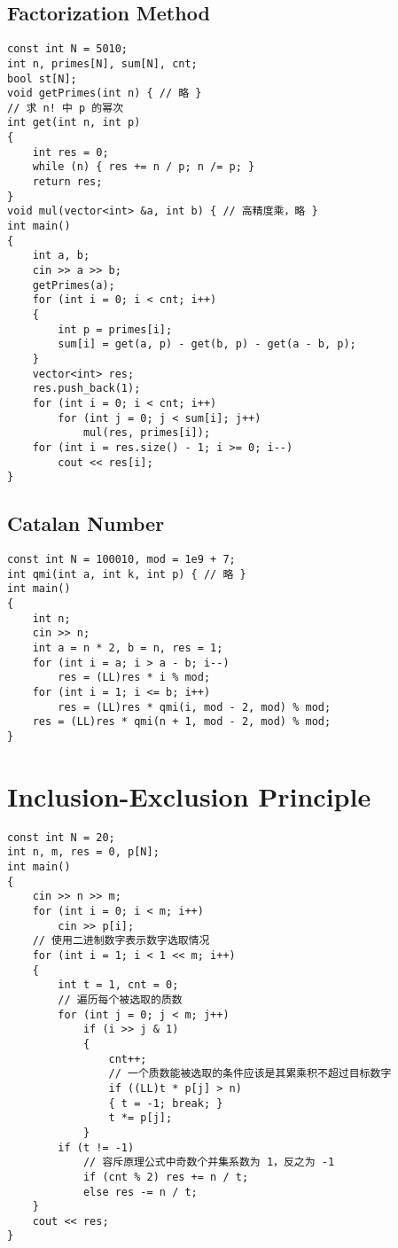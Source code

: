 \subsection{Factorization Method}
\begin{lstlisting}
const int N = 5010;
int n, primes[N], sum[N], cnt;
bool st[N];
void getPrimes(int n) { // 略 }
// 求 n! 中 p 的幂次
int get(int n, int p)
{
    int res = 0;
    while (n) { res += n / p; n /= p; }
    return res;
}
void mul(vector<int> &a, int b) { // 高精度乘，略 }
int main()
{
    int a, b;
    cin >> a >> b;
    getPrimes(a);
    for (int i = 0; i < cnt; i++)
    {
        int p = primes[i];
        sum[i] = get(a, p) - get(b, p) - get(a - b, p);
    }
    vector<int> res;
    res.push_back(1);
    for (int i = 0; i < cnt; i++)
        for (int j = 0; j < sum[i]; j++)
            mul(res, primes[i]);
    for (int i = res.size() - 1; i >= 0; i--)
        cout << res[i];
}
\end{lstlisting}
\subsection{Catalan Number}
\begin{lstlisting}
const int N = 100010, mod = 1e9 + 7;
int qmi(int a, int k, int p) { // 略 }
int main()
{
    int n;
    cin >> n;
    int a = n * 2, b = n, res = 1;
    for (int i = a; i > a - b; i--)
        res = (LL)res * i % mod;
    for (int i = 1; i <= b; i++)
        res = (LL)res * qmi(i, mod - 2, mod) % mod;
    res = (LL)res * qmi(n + 1, mod - 2, mod) % mod;
}
\end{lstlisting}
\section{Inclusion-Exclusion Principle}
\begin{lstlisting}
const int N = 20;
int n, m, res = 0, p[N];
int main()
{
    cin >> n >> m;
    for (int i = 0; i < m; i++)
        cin >> p[i];
    // 使用二进制数字表示数字选取情况
    for (int i = 1; i < 1 << m; i++)
    {
        int t = 1, cnt = 0;
        // 遍历每个被选取的质数
        for (int j = 0; j < m; j++)
            if (i >> j & 1)
            {
                cnt++;
                // 一个质数能被选取的条件应该是其累乘积不超过目标数字
                if ((LL)t * p[j] > n)
                { t = -1; break; }
                t *= p[j];
            }
        if (t != -1)
            // 容斥原理公式中奇数个并集系数为 1，反之为 -1
            if (cnt % 2) res += n / t;
            else res -= n / t;
    }
    cout << res;
}
\end{lstlisting}
